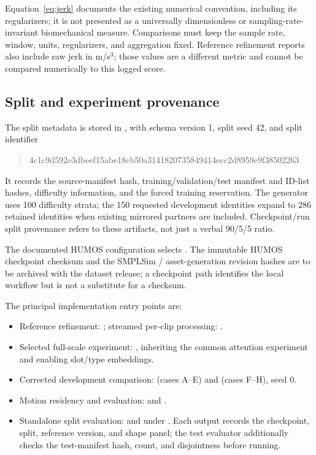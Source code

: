 \documentclass[11pt]{article}
\begin{document}
Equation~\eqref{eq:jerk} documents the existing numerical convention, including
its regularizers; it is not presented as a universally dimensionless or
sampling-rate-invariant biomechanical measure. Comparisons must keep the
sample rate, window, units, regularizers, and aggregation fixed. Reference
refinement reports also include raw jerk in m/s$^3$; those values are a
different metric and cannot be compared numerically to this logged score.

\subsection{Split and experiment provenance}\label{app:provenance}

The split metadata is stored in
, with schema version 1,
split seed 42, and split identifier
\begin{quote}
\footnotesize\ttfamily
4c1c9d592e3dbeef15abe18cb50a3141820735849414ecc2d8959e9f38502263
\end{quote}
It records the source-manifest hash, training/validation/test manifest and
ID-list hashes, difficulty information, and the forced training reservation.
The generator uses 100 difficulty strata; the 150 requested development
identities expand to 286 retained identities when existing mirrored partners
are included. Checkpoint/run split provenance refers to these artifacts,
not just a verbal 90/5/5 ratio.

The documented HUMOS configuration selects
. The immutable
HUMOS checkpoint checksum and the SMPLSim / asset-generation revision hashes
are to be archived with the dataset release; a checkpoint path identifies the
local workflow but is not a substitute for a checksum.

The principal implementation entry points are:
\begin{itemize}
    \item Reference refinement:
    ; streamed per-clip processing:
    .
    \item Selected full-scale experiment:
    ,
    inheriting the common attention experiment and enabling slot/type embeddings.
    \item Corrected development comparison:
     (cases A--E) and
     (cases F--H), seed 0.
    \item Motion residency and evaluation:
     and
    .
    \item Standalone split evaluation:
     and 
    under . Each output records the checkpoint, split,
    reference version, and shape panel; the test evaluator additionally
    checks the test-manifest hash, count, and disjointness before running.
\end{itemize}
\end{document}
